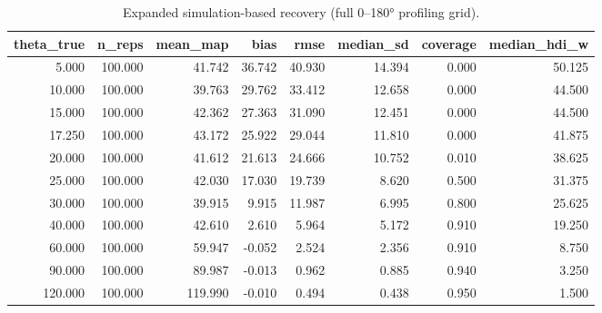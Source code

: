 \begin{table}
\caption{Expanded simulation-based recovery (full 0--180° profiling grid).}
\label{tab:ext-recovery}
\begin{tabular}{rrrrrrrr}
\toprule
theta_true & n_reps & mean_map & bias & rmse & median_sd & coverage & median_hdi_w \\
\midrule
5.000 & 100.000 & 41.742 & 36.742 & 40.930 & 14.394 & 0.000 & 50.125 \\
10.000 & 100.000 & 39.763 & 29.762 & 33.412 & 12.658 & 0.000 & 44.500 \\
15.000 & 100.000 & 42.362 & 27.363 & 31.090 & 12.451 & 0.000 & 44.500 \\
17.250 & 100.000 & 43.172 & 25.922 & 29.044 & 11.810 & 0.000 & 41.875 \\
20.000 & 100.000 & 41.612 & 21.613 & 24.666 & 10.752 & 0.010 & 38.625 \\
25.000 & 100.000 & 42.030 & 17.030 & 19.739 & 8.620 & 0.500 & 31.375 \\
30.000 & 100.000 & 39.915 & 9.915 & 11.987 & 6.995 & 0.800 & 25.625 \\
40.000 & 100.000 & 42.610 & 2.610 & 5.964 & 5.172 & 0.910 & 19.250 \\
60.000 & 100.000 & 59.947 & -0.052 & 2.524 & 2.356 & 0.910 & 8.750 \\
90.000 & 100.000 & 89.987 & -0.013 & 0.962 & 0.885 & 0.940 & 3.250 \\
120.000 & 100.000 & 119.990 & -0.010 & 0.494 & 0.438 & 0.950 & 1.500 \\
\bottomrule
\end{tabular}
\end{table}
